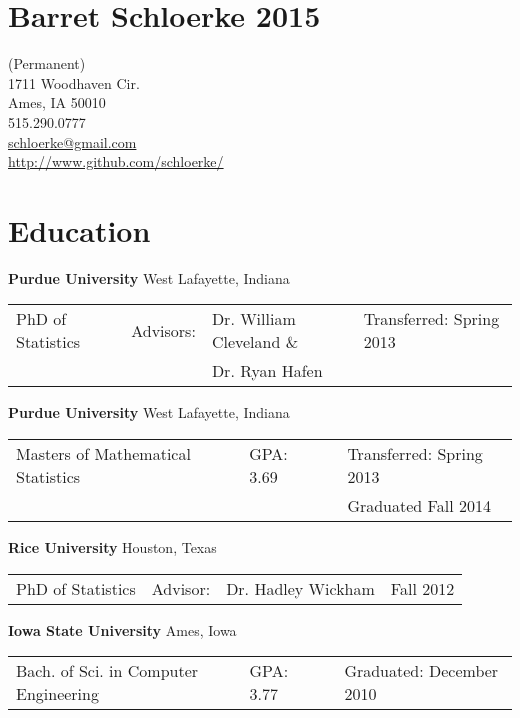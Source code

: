 \documentclass[oneside]{article}
\begin{document}
\section*{Barret Schloerke 2015 }

(Permanent)\\
1711 Woodhaven Cir.\\
Ames, IA 50010 \\
515.290.0777 \\
\href{mailto:schloerke@gmail.com}{schloerke@gmail.com} \\
\url{http://www.github.com/schloerke/}

\section{Education}

\textbf{Purdue University} West Lafayette, Indiana

\begin{tabular}{p{1.5in}p{0.5in}p{1.75in}p{1.75in}}
PhD of Statistics & Advisors: & Dr. William Cleveland \& & Transferred: Spring 2013 \\
                  &           & Dr. Ryan Hafen & \\
\end{tabular}

\vspace{0.5em}

\textbf{Purdue University} West Lafayette, Indiana

\begin{tabular}{p{2.75in}p{0.75in}p{0.25in}p{1.75in}}
Masters of Mathematical Statistics & GPA: 3.69 & & Transferred: Spring 2013 \\
& & & Graduated Fall 2014  \\
\end{tabular}

\vspace{0.5em}

\textbf{Rice University} Houston, Texas

\begin{tabular}{p{1.5in}p{0.5in}p{1.75in}p{1.75in}}
PhD of Statistics & 
Advisor: & Dr. Hadley Wickham & 
Fall 2012
\end{tabular}

\vspace{0.5em}

\textbf{Iowa State University} Ames, Iowa

\begin{tabular}{p{2.75in}p{0.75in}p{0.25in}p{1.75in}}
Bach. of Sci. in Computer Engineering &
GPA: 3.77 & &
Graduated: December 2010
\end{tabular}
\end{document}
